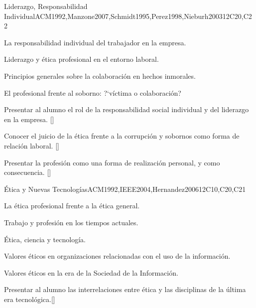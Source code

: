 \begin{syllabus}
\begin{unit}{}{Liderazgo, Responsabilidad Individual}{ACM1992,Manzone2007,Schmidt1995,Perez1998,Nieburh2003}{12}{C20,C22}
\begin{topics}
	\item La responsabilidad individual del trabajador en la empresa.
	\item Liderazgo y ética profesional en el entorno laboral.
	\item Principios generales sobre la colaboración en hechos inmorales.
	\item El profesional frente al soborno: ?`víctima o colaboración?

\end{topics}
\begin{learningoutcomes}
	\item Presentar al alumno el rol de la responsabilidad social individual y del liderazgo en la empresa. [\Familiarity]
	\item Conocer el juicio de la ética frente a la corrupción y sobornos como forma de relación laboral. [\Familiarity]
	\item Presentar la profesión como una forma de realización personal, y como consecuencia. []
\end{learningoutcomes}
\end{unit}

\begin{unit}{}{Ética y Nuevas Tecnologías}{ACM1992,IEEE2004,Hernandez2006}{12}{C10,C20,C21}
\begin{topics}
	\item La ética profesional frente a la ética general.
	\item Trabajo y profesión en los tiempos actuales.
	\item Ética, ciencia y tecnología.
	\item Valores éticos en organizaciones relacionadas con el uso de la información.
	\item Valores éticos en la era de la Sociedad de la Información.
\end{topics}
\begin{learningoutcomes}
	\item Presentar al alumno las interrelaciones entre ética y las disciplinas de la última era tecnológica.[\Familiarity]
\end{learningoutcomes}
\end{unit}


\end{syllabus}
